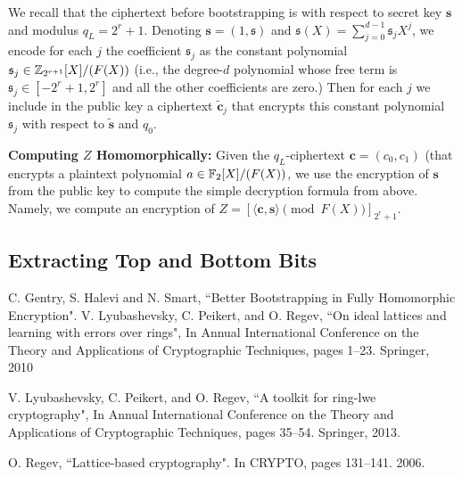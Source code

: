 \documentclass[12pt]{article}
\theoremstyle{plain}
\theoremstyle{definition}
\theoremstyle{remark}
\begin{document}
We recall that the ciphertext before bootstrapping is with respect to secret key $\mathbf{s}$ and modulus $q_L = 2^r + 1$. Denoting $\mathbf{s} = (1, \mathfrak{s})$ and $\mathfrak{s}(X) =\sum_{j=0}^{d-1}\mathfrak{s}_jX^j$, we encode for each $j$ the coefficient $\mathfrak{s}_j$ as the constant polynomial $\mathfrak{s}_j \in \mathbb{Z}_{2^{r+1}}[X]/(F(X))$ (i.e., the degree-$d$ polynomial whose free term is $\mathfrak{s}_j \in [-2^r + 1, 2^r]$ and all the other coefficients are zero.) Then for each $j$ we include in the public key a ciphertext $\tilde{\mathbf{c}}_j$ that encrypts this constant polynomial $\mathfrak{s}_j$ with respect to $\tilde{\mathbf{s}}$ and $q_0$. 

{\bf Computing $Z$ Homomorphically:} Given the $q_L$-ciphertext $\mathbf{c} = (c_0, c_1)$ (that encrypts a plaintext polynomial $a \in  \mathbb{F}_2[X]/(F(X))$, we use the encryption of $\mathbf{s}$ from the public key to compute the simple decryption formula from above. Namely, we compute an encryption of
$Z = [\langle\mathbf{c}, \mathbf{s}\rangle \pmod{F(X)}]_{2^r+1}$. 

\subsection{Extracting Top and Bottom Bits}
\begin{thebibliography}{99}
 
  C. Gentry, S. Halevi and N. Smart, ``Better Bootstrapping in Fully Homomorphic Encryption". 
 V. Lyubashevsky, C. Peikert, and O. Regev, ``On ideal lattices and learning with errors over rings", In Annual International Conference on the Theory and Applications of Cryptographic Techniques, pages 1–23. Springer, 2010

 V. Lyubashevsky, C. Peikert, and O. Regev, ``A toolkit for ring-lwe cryptography", In Annual International Conference on the Theory and Applications of Cryptographic Techniques, pages 35–54. Springer, 2013.

 O. Regev, ``Lattice-based cryptography". In CRYPTO, pages 131–141. 2006. 

\end{thebibliography}
\end{document}
